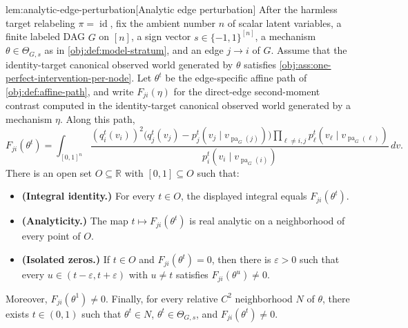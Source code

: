 \documentclass[11pt]{article}
\begin{document}
\begin{lemmav}{lem:analytic-edge-perturbation}[Analytic edge perturbation]
After the harmless target relabeling \(\pi=\operatorname{id}\), fix the ambient number \(n\) of scalar latent variables, a finite labeled DAG \(G\) on \([n]\), a sign vector \(s\in\{-1,1\}^{[n]}\), a mechanism \(\theta\in\Theta_{G,s}\) as in \cref{obj:def:model-stratum}, and an edge \(j\to i\) of \(G\). Assume that the identity-target canonical observed world generated by \(\theta\) satisfies \cref{obj:ass:one-perfect-intervention-per-node}. Let \(\theta^t\) be the edge-specific affine path of \cref{obj:def:affine-path}, and write \(F_{ji}(\eta)\) for the direct-edge second-moment contrast computed in the identity-target canonical observed world generated by a mechanism \(\eta\). Along this path,
\[
F_{ji}(\theta^t)
=
\int_{[0,1]^n}
\frac{(q_i^t(v_i))^2\bigl(q_j^t(v_j)-p_j^t(v_j\mid v_{\operatorname{pa}_G(j)})\bigr)
\prod_{\ell\ne i,j}p_\ell^t(v_\ell\mid v_{\operatorname{pa}_G(\ell)})}
{p_i^t(v_i\mid v_{\operatorname{pa}_G(i)})}
\,dv .
\]
There is an open set \(O\subseteq\mathbb R\) with \([0,1]\subseteq O\) such that:
\begin{itemize}
\item \textbf{(Integral identity.)} For every \(t\in O\), the displayed integral equals \(F_{ji}(\theta^t)\).
\item \textbf{(Analyticity.)} The map \(t\mapsto F_{ji}(\theta^t)\) is real analytic on a neighborhood of every point of \(O\).
\item \textbf{(Isolated zeros.)} If \(t\in O\) and \(F_{ji}(\theta^t)=0\), then there is \(\varepsilon>0\) such that every \(u\in(t-\varepsilon,t+\varepsilon)\) with \(u\ne t\) satisfies \(F_{ji}(\theta^u)\ne0\).
\end{itemize}
Moreover, \(F_{ji}(\theta^1)\ne0\). Finally, for every relative \(C^2\) neighborhood \(N\) of \(\theta\), there exists \(t\in(0,1)\) such that \(\theta^t\in N\), \(\theta^t\in\Theta_{G,s}\), and \(F_{ji}(\theta^t)\ne0\).
\end{lemmav}
\end{document}
